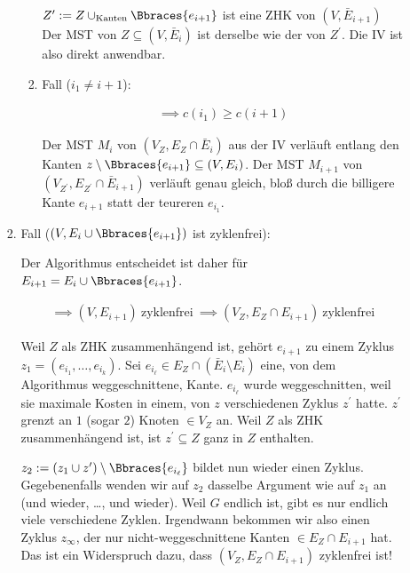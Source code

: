 \begin{solution}
\begin{enumerate}[label = (\Alph*)]
\begin{enumerate}[label = \arabic*.]
\begin{enumerate}[label = 2.\arabic*.]
\begin{enumerate}[label = 2.1.\arabic*.]
                $Z^\prime := Z \cup_\mathrm{Kanten} \Bbraces{e_{i+1}}$ ist eine ZHK von $(V, \bar E_{i+1})$
                Der MST von $Z \subseteq (V, \bar E_i)$ ist derselbe wie der von $Z^\prime$.
                Die IV ist also direkt anwendbar.

                \item Fall ($i_1 \neq i+1$):
                
                \begin{align*}
                    \implies
                    c(i_1) \geq c(i+1)
                \end{align*}

                Der MST $M_i$ von $(V_Z, E_Z \cap \bar E_i)$ aus der IV verläuft entlang den Kanten $z \setminus \Bbraces{e_{i+1}} \subseteq (V, E_i)$.
                Der MST $M_{i+1}$ von $(V_{Z^\prime}, E_{Z^\prime} \cap \bar E_{i+1})$ verläuft genau gleich, bloß durch die billigere Kante $e_{i+1}$ statt der teureren $e_{i_1}$.

            \end{enumerate}

            \item Fall ($(V, E_i \cup \Bbraces{e_{i+1}})$ ist zyklenfrei):
            
            Der Algorithmus entscheidet ist daher für $E_{i+1} = E_i \cup \Bbraces{e_{i+1}}$.

            \begin{align*}
                \implies
                (V, E_{i+1}) ~\text{zyklenfrei}~
                \implies
                (V_Z, E_Z \cap E_{i+1}) ~\text{zyklenfrei}
            \end{align*}

            Weil $Z$ als ZHK zusammenhängend ist, gehört $e_{i+1}$ zu einem Zyklus $z_1 = (e_{i_1}, \dots, e_{i_k})$.
            Sei $e_{i_\ell} \in E_Z \cap (\bar E_i \setminus E_i)$ eine, von dem Algorithmus weggeschnittene, Kante.
            $e_{i_\ell}$ wurde weggeschnitten, weil sie maximale Kosten in einem, von $z$ verschiedenen Zyklus $z^\prime$ hatte.
            $z^\prime$ grenzt an $1$ (sogar $2$) Knoten $\in V_Z$ an.
            Weil $Z$ als ZHK zusammenhängend ist, ist $z^\prime \subseteq Z$ ganz in $Z$ enthalten.

            $z_2 := (z_1 \cup z^\prime) \setminus \Bbraces{e_{i_\ell}}$ bildet nun wieder einen Zyklus.
            Gegebenenfalls wenden wir auf $z_2$ dasselbe Argument wie auf $z_1$ an (und wieder, \dots, und wieder).
            Weil $G$ endlich ist, gibt es nur endlich viele verschiedene Zyklen.
            Irgendwann bekommen wir also einen Zyklus $z_\infty$, der nur nicht-weggeschnittene Kanten $\in E_Z \cap E_{i+1}$ hat.
            Das ist ein Widerspruch dazu, dass $(V_Z, E_Z \cap E_{i+1})$ zyklenfrei ist!


\end{enumerate}
\end{enumerate}
\end{enumerate}
\end{solution}
